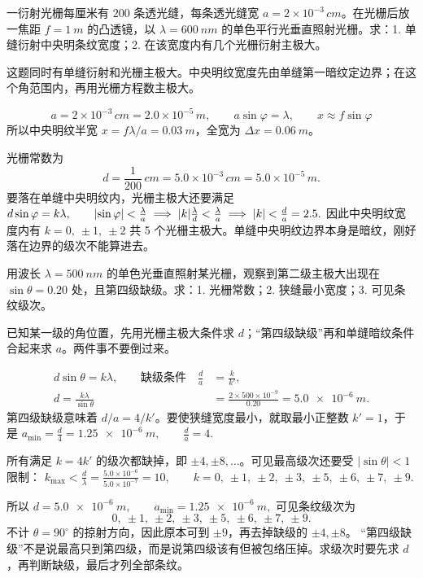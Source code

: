 \documentclass[lang=cn,11pt]{elegantbook}
\begin{document}
\begin{exercise}
一衍射光栅每厘米有 \(200\) 条透光缝，每条透光缝宽 \(a=2\times10^{-3}\,\si{cm}\)。在光栅后放一焦距 \(f=\SI{1}{m}\) 的凸透镜，以 \(\lambda=\SI{600}{nm}\) 的单色平行光垂直照射光栅。求：1. 单缝衍射中央明条纹宽度；2. 在该宽度内有几个光栅衍射主极大。
\end{exercise}

\begin{solution}
这题同时有单缝衍射和光栅主极大。中央明纹宽度先由单缝第一暗纹定边界；在这个角范围内，再用光栅方程数主极大。

\[
a=2\times10^{-3}\,\si{cm}=2.0\times10^{-5}\,\si{m},\qquad
a\sin\varphi=\lambda,\qquad
x\approx f\sin\varphi
\]
所以中央明纹半宽 \(x=f\lambda/a=\SI{0.03}{m}\)，全宽为 \(\Delta x=\SI{0.06}{m}\)。

光栅常数为
\[
d=\frac{1}{200}\,\si{cm}=5.0\times10^{-3}\,\si{cm}=5.0\times10^{-5}\,\si{m}.
\]
要落在单缝中央明纹内，光栅主极大还要满足
 \(d\sin\varphi=k\lambda,\qquad \abs{\sin\varphi}<\frac{\lambda}{a} \implies \abs{k}\frac{\lambda}{d}<\frac{\lambda}{a} \implies \abs{k}<\frac{d}{a}=2.5.\) 
因此中央明纹宽度内有 \(k=0,\ \pm1,\ \pm2\) 共 5 个光栅主极大。单缝中央明纹边界本身是暗纹，刚好落在边界的级次不能算进去。
\end{solution}

\begin{exercise}[第二级出现在 \(\sin\theta=0.20\) 且第四级缺级时怎样反推光栅参数]
用波长 \(\lambda=\SI{500}{nm}\) 的单色光垂直照射某光栅，观察到第二级主极大出现在 \(\sin\theta=0.20\) 处，且第四级缺级。求：1. 光栅常数；2. 狭缝最小宽度；3. 可见条纹级次。
\end{exercise}

\begin{solution}
已知某一级的角位置，先用光栅主极大条件求 \(d\)；“第四级缺级”再和单缝暗纹条件合起来求 \(a\)。两件事不要倒过来。

\[
\begin{aligned}
d\sin\theta=k\lambda,\qquad
\text{缺级条件}\quad \frac{d}{a}&=\frac{k}{k'},\\
d=\frac{k\lambda}{\sin\theta}
&=\frac{2\times 500\times10^{-9}}{0.20}
=\SI{5.0e-6}{m}.
\end{aligned}
\]
第四级缺级意味着 \(d/a=4/k'\)。要使狭缝宽度最小，就取最小正整数 \(k'=1\)，于是
 \(a_{\min}=\frac{d}{4}=\SI{1.25e-6}{m},\qquad \frac{d}{a}=4.\) 

所有满足 \(k=4k'\) 的级次都缺掉，即 \(\pm4,\pm8,\dots\)。可见最高级次还要受 \(|\sin\theta|<1\) 限制：
 \(k_{\max}<\frac{d}{\lambda} =\frac{5.0\times10^{-6}}{5.0\times10^{-7}}=10, \qquad k=0,\ \pm1,\ \pm2,\ \pm3,\ \pm5,\ \pm6,\ \pm7,\ \pm9.\) 

所以
 \(d=\SI{5.0e-6}{m},\qquad a_{\min}=\SI{1.25e-6}{m},\) 
可见条纹级次为
\[
0,\ \pm1,\ \pm2,\ \pm3,\ \pm5,\ \pm6,\ \pm7,\ \pm9.
\]
不计 \(\theta=90^\circ\) 的掠射方向，因此原本可到 \(\pm9\)，再去掉缺级的 \(\pm4,\pm8\)。
“第四级缺级”不是说最高只到第四级，而是说第四级该有但被包络压掉。求级次时要先求 \(d\)，再判断缺级，最后才列全部条纹。
\end{solution}
\end{document}
